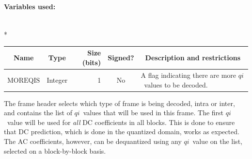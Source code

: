 \documentclass[9pt,letterpaper]{book}
\newcommand{\idx}[1]{{\ensuremath{\mathit{#1}}}}
\newcommand{\qi}{\idx{qi}}
\newcommand{\locvar}[1]{\ensuremath{\mathrm{#1}}}
\numberwithin{equation}{chapter}
\numberwithin{figure}{chapter}
\numberwithin{table}{chapter}
\begin{document}
\paragraph{Variables used:}\hfill\\*
\begin{tabularx}{\textwidth}{@{}llrcX@{}}\toprule
\multicolumn{1}{c}{Name} &
\multicolumn{1}{c}{Type} &
\multicolumn{1}{p{30pt}}{\centering Size (bits)} &
\multicolumn{1}{c}{Signed?} &
\multicolumn{1}{c}{Description and restrictions} \\\midrule\endhead
\locvar{MOREQIS} & Integer &  1 & No & A flag indicating there are more
 \qi\ values to be decoded. \\
\bottomrule\end{tabularx}
\medskip

The frame header selects which type of frame is being decoded, intra or inter,
 and contains the list of \qi\ values that will be used in this frame.
The first \qi\ value will be used for {\em all} DC coefficients in all blocks.
This is done to ensure that DC prediction, which is done in the quantized
 domain, works as expected.
The AC coefficients, however, can be dequantized using any \qi\ value on the
 list, selected on a block-by-block basis.
\end{document}
